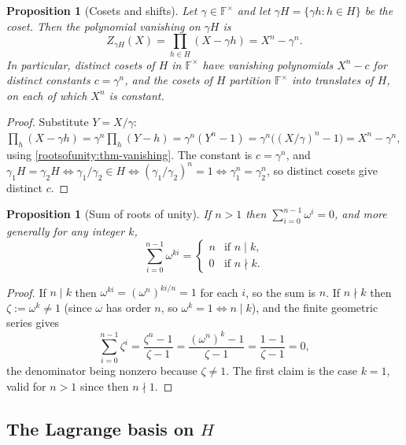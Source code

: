 \documentclass[11pt,a4paper]{article}
\newtheorem{proposition}[theorem]{Proposition}
\theoremstyle{definition}
\theoremstyle{remark}
\newcommand{\F}{\ensuremath{\mathbb{F}}}
\begin{document}
\begin{proposition}[Cosets and shifts]\label{rootsofunity:prp-coset}
Let \(\gamma \in \F^\times\) and let \(\gamma H = \{\gamma h : h \in H\}\) be the coset. Then the polynomial vanishing on \(\gamma H\) is
\[
  Z_{\gamma H}(X) = \prod_{h \in H}(X - \gamma h) = X^n - \gamma^n.
\]
In particular, distinct cosets of \(H\) in \(\F^\times\) have vanishing polynomials \(X^n - c\) for distinct constants \(c = \gamma^n\), and the cosets of \(H\) partition \(\F^\times\) into translates of \(H\), on each of which \(X^n\) is constant.
\end{proposition}

\begin{proof}
Substitute \(Y = X/\gamma\): \(\prod_{h}(X - \gamma h) = \gamma^n \prod_h (Y - h) = \gamma^n (Y^n - 1) = \gamma^n\bigl((X/\gamma)^n - 1\bigr) = X^n - \gamma^n\), using \cref{rootsofunity:thm-vanishing}. The constant is \(c = \gamma^n\), and \(\gamma_1 H = \gamma_2 H \iff \gamma_1/\gamma_2 \in H \iff (\gamma_1/\gamma_2)^n = 1 \iff \gamma_1^n = \gamma_2^n\), so distinct cosets give distinct \(c\).
\end{proof}

\begin{proposition}[Sum of roots of unity]\label{rootsofunity:prp-sumroots}
If \(n > 1\) then \(\sum_{i=0}^{n-1} \omega^i = 0\), and more generally for any integer \(k\),
\[
  \sum_{i=0}^{n-1} \omega^{ki} = \begin{cases} n & \text{if } n \mid k,\\[2pt] 0 & \text{if } n \nmid k.\end{cases}
\]
\end{proposition}

\begin{proof}
If \(n \mid k\) then \(\omega^{ki} = (\omega^n)^{ki/n} = 1\) for each \(i\), so the sum is \(n\). If \(n \nmid k\) then \(\zeta := \omega^k \ne 1\) (since \(\omega\) has order \(n\), so \(\omega^k = 1 \iff n \mid k\)), and the finite geometric series gives
\[
  \sum_{i=0}^{n-1} \zeta^i = \frac{\zeta^n - 1}{\zeta - 1} = \frac{(\omega^n)^k - 1}{\zeta - 1} = \frac{1 - 1}{\zeta - 1} = 0,
\]
the denominator being nonzero because \(\zeta \ne 1\). The first claim is the case \(k = 1\), valid for \(n > 1\) since then \(n \nmid 1\).
\end{proof}

\subsection{The Lagrange basis on \(H\)}
\end{document}
